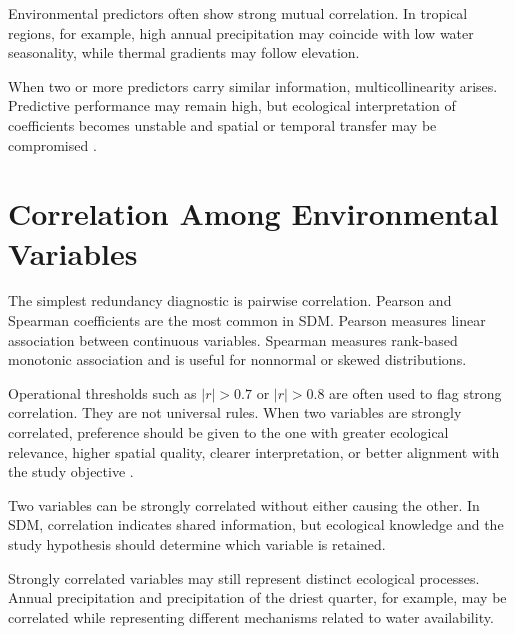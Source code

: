 Environmental predictors often show strong mutual correlation. In tropical
regions, for example, high annual precipitation may coincide with low water
seasonality, while thermal gradients may follow elevation.

When two or more predictors carry similar information, multicollinearity
arises. Predictive performance may remain high, but ecological interpretation
of coefficients becomes unstable and spatial or temporal transfer may be
compromised \parencite{dormann2013collinearity}.

\section{Correlation Among Environmental Variables}

The simplest redundancy diagnostic is pairwise correlation. Pearson and
Spearman coefficients are the most common in SDM. Pearson measures linear
association between continuous variables. Spearman measures rank-based
monotonic association and is useful for nonnormal or skewed distributions.

Operational thresholds such as \(|r| > 0.7\) or \(|r| > 0.8\) are often used to
flag strong correlation. They are not universal rules. When two variables are
strongly correlated, preference should be given to the one with greater
ecological relevance, higher spatial quality, clearer interpretation, or better
alignment with the study objective
\parencite{dormann2013collinearity,raes2018modeling}.

\begin{conceito}[title={\faBook\quad Correlation is not causation}]
Two variables can be strongly correlated without either causing the other. In
SDM, correlation indicates shared information, but ecological knowledge and the
study hypothesis should determine which variable is retained.
\end{conceito}

\begin{conceito}[title={\faBook\quad Statistical correlation does not imply ecological redundancy}]
Strongly correlated variables may still represent distinct ecological
processes. Annual precipitation and precipitation of the driest quarter, for
example, may be correlated while representing different mechanisms related to
water availability.
\end{conceito}


